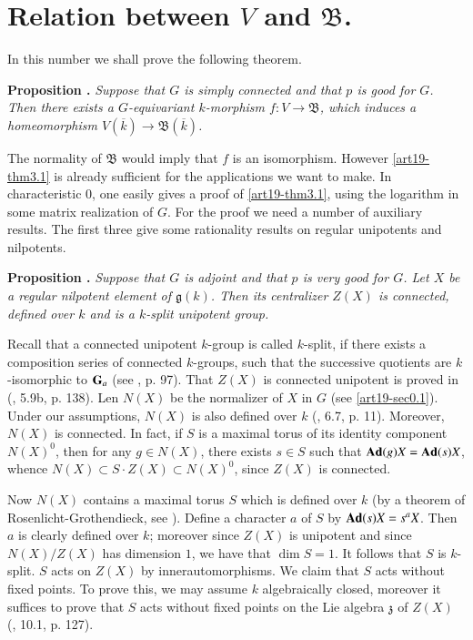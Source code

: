 \section{Relation between \texorpdfstring{$V$}{V} and \texorpdfstring{$\mathfrak{B}$}{B}.}\label{art19-sec3}

In this number we shall prove the following theorem.

\medskip
\noindent
{\bf Proposition .\label{art19-thm3.1}}
{\em Suppose that $G$ is simply connected and that $p$ is good for $G$. Then there exists a $G$-equivariant $k$-morphism $f:V\to \mathfrak{B}$, which induces a homeomorphism $V(\overline{k})\to \mathfrak{B}(\overline{k})$.}
\smallskip

The normality of $\mathfrak{B}$ would imply that $f$ is an isomorphism. However \ref{art19-thm3.1} is already sufficient for the applications we want to make. In characteristic $0$, one easily gives a proof of \ref{art19-thm3.1}, using the logarithm in some matrix realization of $G$. For the proof we need a number of auxiliary results. The first three give some rationality results on regular unipotents and nilpotents.

\medskip
\noindent
{\bf Proposition .\label{art19-prop3.2}}
{\em Suppose that $G$ is adjoint and that $p$ is very good for $G$. Let $X$ be a regular nilpotent element of $\mathfrak{g}(k)$. Then its centralizer $Z(X)$ is connected, defined over $k$ and is a $k$-split unipotent group.}
\smallskip

Recall that a connected unipotent $k$-group is called $k$-split, if there exists a composition series of connected $k$-groups, such that the successive quotients are $k$-isomorphic to $\mathbf{G}_{a}$ (see \cite{art19-key11}, p. 97). That $Z(X)$ is connected unipotent is proved in (\cite{art19-key14}, 5.9b, p. 138). Len $N(X)$ be the normalizer of $X$ in $G$ (see \ref{art19-sec0.1}). Under our assumptions, $N(X)$ is also defined over $k$ (\cite{art19-key10}, 6.7, p. 11). Moreover, $N(X)$ is connected. In fact, if $S$ is a maximal torus of its identity component $N(X)^{0}$, then for any $g\in N(X)$, there exists $s\in S$ such that $\mathbf{Ad}(g)X=\mathbf{Ad}(s)X$, whence $N(X)\subset S\cdot Z(X)\subset N(X)^{0}$, since $Z(X)$ is connected.

Now $N(X)$ contains a maximal torus $S$ which is defined over $k$ (by a theorem of Rosenlicht-Grothendieck, see \cite{art19-key1}). Define a character $a$ of $S$ by $\mathbf{Ad}(s)X=s^{a}X$. Then $a$ is clearly defined over $k$; moreover since $Z(X)$ is unipotent and since $N(X)/Z(X)$ has dimension $1$, we have that $\dim S=1$. It follows that $S$ is $k$-split. $S$ acts on $Z(X)$ by inner\pageoriginale automorphisms. We claim that $S$ acts without fixed points. To prove this, we may assume $k$ algebraically closed, moreover it suffices to prove that $S$ acts without fixed points on the Lie algebra $\mathfrak{z}$ of $Z(X)$ (\cite{art19-key3}, 10.1, p. 127).

